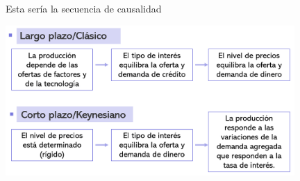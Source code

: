 \documentclass{beamer}
\begin{document}
\begin{frame}{Esta sería la secuencia de causalidad}

\centering\includegraphics[width=11cm]{Slides Principios de Economia/Figures/P18.png}\

\end{frame}



\end{document}
